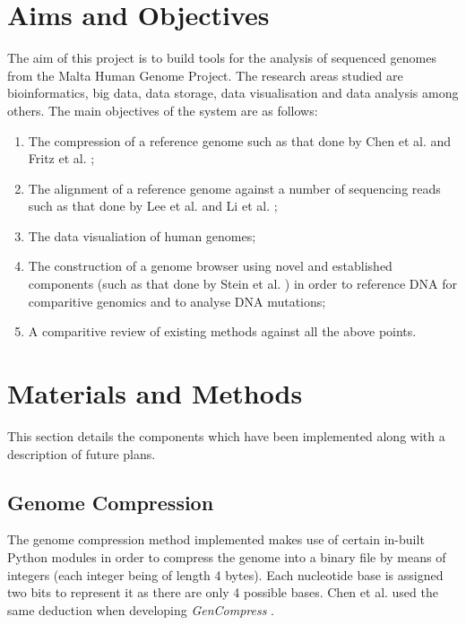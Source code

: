 \documentclass{csfyp}
\begin{document}
\section{Aims and Objectives}\vspace{-2ex}

The aim of this project is to build tools for the analysis of sequenced genomes from the Malta Human Genome Project.  The research areas studied are bioinformatics, big data, data storage, data visualisation and data analysis among others.  The main objectives of the system are as follows:

\begin{enumerate}[nolistsep]

   \item The compression of a reference genome such as that done by Chen et al. \cite{gencompress} and Fritz et al. \cite{refcompression};

  \item The alignment of a reference genome against a number of sequencing reads such as that done by Lee et al. \cite{cgreads} and Li et al. \cite{bwtransform};

  \item The data visualiation of human genomes;

  \item The construction of a genome browser using novel and established components (such as that done by Stein et al. \cite{genericbrowser}) in order to reference DNA for comparitive genomics and to analyse DNA mutations;  

  \item A comparitive review of existing methods against all the above points.

\end{enumerate}


\section{Materials and Methods}\vspace{-2ex}

This section details the components which have been implemented along with a description of future plans.

\subsection{Genome Compression}\vspace{-2ex}
The genome compression method implemented makes use of certain in-built Python modules in order to compress the genome into a binary file by means of integers (each integer being of length 4 bytes).  Each nucleotide base is assigned two bits to represent it as there are only 4 possible bases. Chen et al. used the same deduction when developing {\textit{GenCompress}} \cite{gencompress}.  
\end{document}
